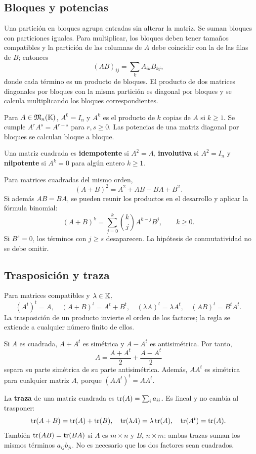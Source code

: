 \subsection*{Bloques y potencias}

Una partición en bloques agrupa entradas sin alterar la matriz. Se suman
bloques con particiones iguales. Para multiplicar, los bloques deben tener
tamaños compatibles y la partición de las columnas de $A$ debe coincidir
con la de las filas de $B$; entonces
\[
 (AB)_{ij}=\sum_k A_{ik}B_{kj},
\]
donde cada término es un producto de bloques. El producto de dos matrices
diagonales por bloques con la misma partición es diagonal por bloques
y se calcula multiplicando los bloques correspondientes.

Para $A\in\mathfrak{M}_n(\mathbb{K})$, $A^0=I_n$ y $A^k$ es el producto de $k$ copias de
$A$ si $k\ge1$. Se cumple $A^rA^s=A^{r+s}$ para $r,s\ge0$.
Las potencias de una matriz diagonal por bloques se calculan bloque a bloque.

Una matriz cuadrada es \textbf{idempotente} si $A^2=A$,
\textbf{involutiva} si $A^2=I_n$ y \textbf{nilpotente} si $A^k=0$
para algún entero $k\ge1$.

Para matrices cuadradas del mismo orden,
\[
 (A+B)^2=A^2+AB+BA+B^2.
\]
Si además $AB=BA$, se pueden reunir los productos en el desarrollo
y aplicar la fórmula binomial:
\[
 (A+B)^k=\sum_{j=0}^{k}\binom{k}{j}A^{k-j}B^j,\qquad k\ge0.
\]
Si $B^s=0$, los términos con $j\ge s$ desaparecen. La hipótesis de
conmutatividad no se debe omitir.

\subsection*{Trasposición y traza}

Para matrices compatibles y $\lambda\in\mathbb{K}$,
\[
 (A^t)^t=A,\quad (A+B)^t=A^t+B^t,\quad
 (\lambda A)^t=\lambda A^t,\quad (AB)^t=B^tA^t.
\]
La trasposición de un producto invierte el orden de los factores; la regla
se extiende a cualquier número finito de ellos.

Si $A$ es cuadrada, $A+A^t$ es simétrica y $A-A^t$ es antisimétrica.
Por tanto,
\[
 A=\frac{A+A^t}{2}+\frac{A-A^t}{2}
\]
separa su parte simétrica de su parte antisimétrica. Además, $AA^t$ es
simétrica para cualquier matriz $A$, porque $(AA^t)^t=AA^t$.

La \textbf{traza} de una matriz cuadrada es $\operatorname{tr}(A)=\sum_i a_{ii}$.
Es lineal y no cambia al trasponer:
\[
 \operatorname{tr}(A+B)=\operatorname{tr}(A)+\operatorname{tr}(B),\quad
 \operatorname{tr}(\lambda A)=\lambda\operatorname{tr}(A),\quad \operatorname{tr}(A^t)=\operatorname{tr}(A).
\]
También $\operatorname{tr}(AB)=\operatorname{tr}(BA)$ si $A$ es $m\times n$ y $B$, $n\times m$:
ambas trazas suman los mismos términos $a_{ij}b_{ji}$. No es necesario
que los dos factores sean cuadrados.

